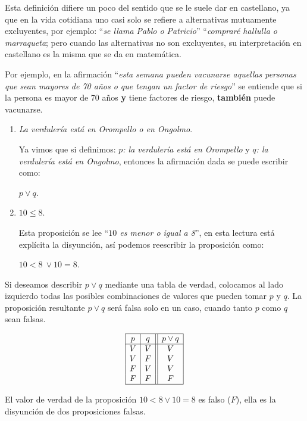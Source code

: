 \begin{itemize}
Esta definición difiere un poco del sentido que se le suele dar en castellano, 
ya que en la vida cotidiana uno casi solo se refiere 
a alternativas mutuamente excluyentes, por ejemplo: 
``{\em se llama Pablo o Patricio}'' 
``{\em compraré hallulla o marraqueta}; 
pero cuando las alternativas no son excluyentes, 
su interpretación en castellano es la misma que se da en matemática.

Por ejemplo, en la afirmación 
``{\em esta semana pueden vacunarse aquellas personas que sean mayores de 
	70 años o que tengan un factor de riesgo}'' 
se entiende que si la persona 
es mayor de 70 años \textbf{y} tiene factores de riesgo, 
\textbf{también} puede vacunarse.

\medskip


\begin{ejemplo}\leavevmode
\begin{enumerate}
\item {\em La verdulería está en Orompello o en Ongolmo}.

Ya vimos que si definimos:  {\em $p$: la verdulería está en Orompello} y 
{\em $q$: la verdulería está en Ongolmo}, 
entonces la afirmación dada se puede escribir como:\\
\centerline{\em $p\vee q$.}

\item {$10 \le 8$}.

Esta proposición se lee ``{\em $10$ es menor o igual a 8}'', 
en esta lectura está explícita la disyunción, 
así podemos reescribir la proposición como:\\

\centerline{\em $10<8\ \vee 10=8$.}
\end{enumerate}
\end{ejemplo}

Si deseamos describir 
$p\vee q$ 
mediante una tabla de verdad, 
colocamos al lado izquierdo 
todas las posibles combinaciones de valores que pueden tomar $p$ y $q$. 
La proposición resultante $p\vee q$ será falsa solo en un caso, cuando tanto
$p$ como $q$ sean falsas.

$$\begin{array}{|c|c||c|}
\hline
 p& q& p\lor q \cr
\hline
V&V&V\cr
V&F&V\cr
F&V&V\cr
F&F&F\cr
\hline
\end{array}$$

El valor de verdad de la 
proposici\'on $10 < 8 \vee 10 = 8$ es falso ($F$), ella es la disyunci\'on
de dos proposiciones falsas.

\medskip 


\end{itemize}
